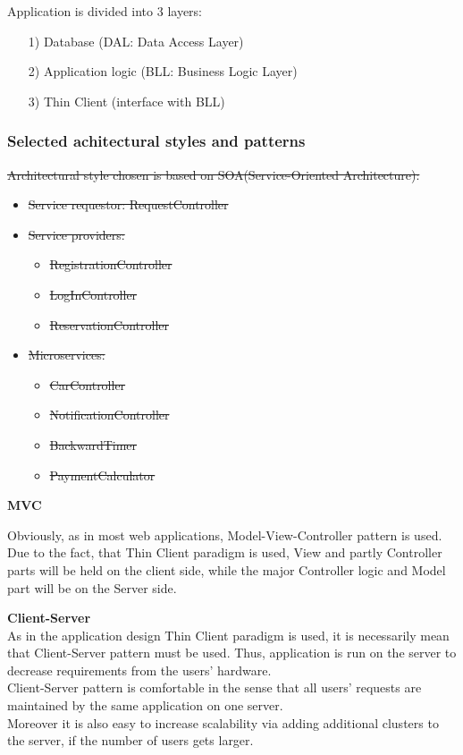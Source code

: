 \documentclass[12pt, letterpaper]{article}
\begin{document}
Application is divided into 3 layers:
\begin{itemize}
	\item [1)] Database (DAL: Data Access Layer)
	\item [2)] Application logic (BLL: Business Logic Layer)
	\item [3)] Thin Client (interface with BLL)
\end{itemize}

\subsubsection{Selected achitectural styles and patterns}

\sout{Architectural style chosen is based on SOA(Service-Oriented Architecture):}
\begin{itemize}
	\item \sout{Service requestor: RequestController}
	\item \sout{Service providers:}
	\begin{itemize}
		\item \sout{RegistrationController}
		\item \sout{LogInController}
		\item \sout{ReservationController}
	\end{itemize}
	\item \sout{Microservices:}
	\begin{itemize}
		\item \sout{CarController}
		\item \sout{NotificationController}
		\item \sout{BackwardTimer}
		\item \sout{PaymentCalculator}
	\end{itemize}
\end{itemize}

\vspace{0.5cm}
\textbf{MVC} \\
\vspace{0.5cm}

Obviously, as in most web applications, Model-View-Controller pattern is used. 
Due to the fact, that Thin Client paradigm is used, View and partly Controller parts will be held on the client side, while the major Controller logic and Model part will be on the Server side.    

\vspace{0.5cm}
\textbf{Client-Server} \\
\vspace{0.5cm}
As in the application design Thin Client paradigm is used, it is necessarily mean that Client-Server pattern must be used. Thus, application is run on the server to decrease requirements from the users' hardware. \\
Client-Server pattern is comfortable in the sense that all users' requests are maintained by the same application on one server. \\
Moreover it is also easy to increase scalability via adding additional clusters to the server, if the number of users gets larger. \\
\newpage
\end{document}
